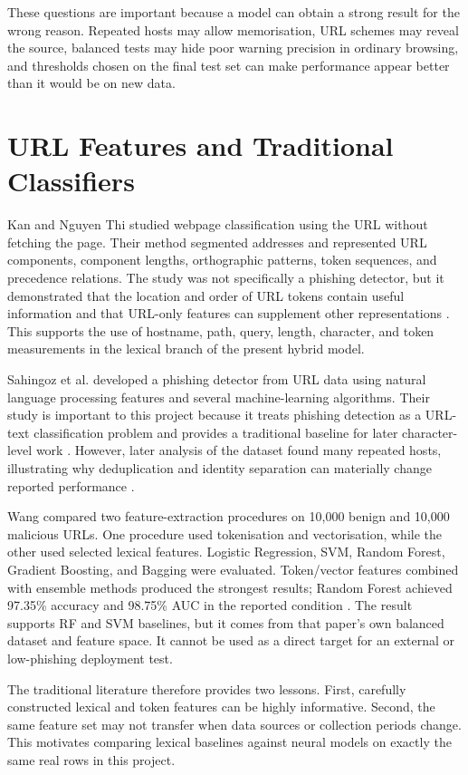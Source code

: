 These questions are important because a model can obtain a strong result for
the wrong reason. Repeated hosts may allow memorisation, URL schemes may reveal
the source, balanced tests may hide poor warning precision in ordinary browsing,
and thresholds chosen on the final test set can make performance appear better
than it would be on new data.

\section{URL Features and Traditional Classifiers}

Kan and Nguyen Thi studied webpage classification using the URL without
fetching the page. Their method segmented addresses and represented URL
components, component lengths, orthographic patterns, token sequences, and
precedence relations. The study was not specifically a phishing detector, but
it demonstrated that the location and order of URL tokens contain useful
information and that URL-only features can supplement other representations
\citep{kan2005fast}. This supports the use of hostname, path, query, length,
character, and token measurements in the lexical branch of the present hybrid
model.

Sahingoz et al. developed a phishing detector from URL data using natural
language processing features and several machine-learning algorithms. Their
study is important to this project because it treats phishing detection as a
URL-text classification problem and provides a traditional baseline for later
character-level work \citep{sahingoz2019machine}. However, later analysis of
the dataset found many repeated hosts, illustrating why deduplication and
identity separation can materially change reported performance
\citep{alalyan2020robust}.

Wang compared two feature-extraction procedures on 10,000 benign and 10,000
malicious URLs. One procedure used tokenisation and vectorisation, while the
other used selected lexical features. Logistic Regression, SVM, Random Forest,
Gradient Boosting, and Bagging were evaluated. Token/vector features combined
with ensemble methods produced the strongest results; Random Forest achieved
97.35\% accuracy and 98.75\% AUC in the reported condition
\citep{wang2022malicious}. The result supports RF and SVM baselines, but it
comes from that paper's own balanced dataset and feature space. It cannot be
used as a direct target for an external or low-phishing deployment test.

The traditional literature therefore provides two lessons. First, carefully
constructed lexical and token features can be highly informative. Second, the
same feature set may not transfer when data sources or collection periods
change. This motivates comparing lexical baselines against neural models on
exactly the same real rows in this project.

